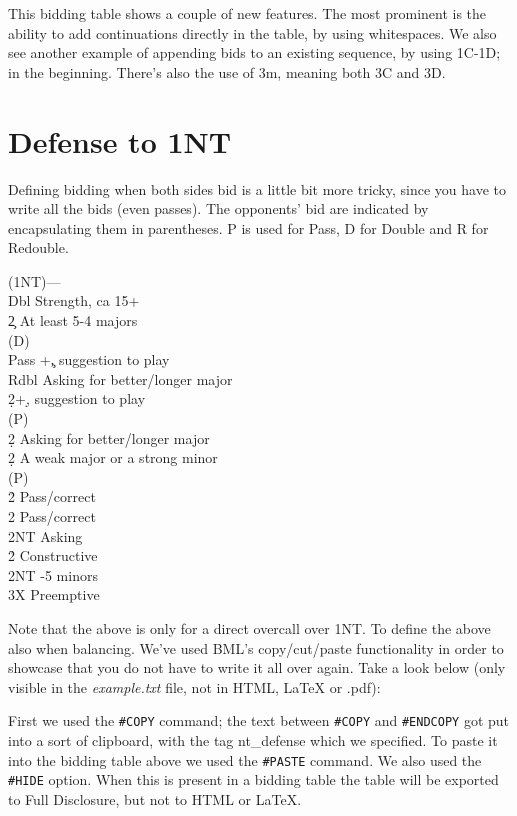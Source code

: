 \documentclass[a4paper]{article}
\begin{document}
This bidding table shows a couple of new features. The most
prominent is the ability to add continuations directly in the
table, by using whitespaces. We also see another example of
appending bids to an existing sequence, by using 1C-1D; in the
beginning. There's also the use of 3m, meaning both 3C and 3D.

\section{Defense to 1NT}

Defining bidding when both sides bid is a little bit more tricky,
since you have to write all the bids (even passes). The opponents'
bid are indicated by encapsulating them in parentheses. P is used
for Pass, D for Double and R for Redouble.

\begin{bidtable}
(1NT)---\\
Dbl \> Strength, ca 15+\\
2\c \> At least 5-4 majors\+\\
(D)\+\\
Pass +\c , suggestion to play\\
Rdbl \> Asking for better/longer major\\
2\d {}+\d , suggestion to play\-\\
(P)\+\\
2\d \> Asking for better/longer major\-\-\\
2\d \> A weak major or a strong minor\+\\
(P)\+\\
2\h \> Pass/correct\\
2\s \> Pass/correct\\
2NT \> Asking\-\-\\
2\h\s \> Constructive\\
2NT -5 minors\\
3X \> Preemptive
\end{bidtable}

Note that the above is only for a direct overcall over 1NT. To
define the above also when balancing. We've used BML's
copy/cut/paste functionality in order to showcase that you do not
have to write it all over again. Take a look below (only visible in
the \emph{example.txt} file, not in HTML, LaTeX or .pdf):

First we used the \texttt{\#COPY} command; the text between \texttt{\#COPY} and \texttt{\#ENDCOPY}
got put into a sort of clipboard, with the tag nt\_defense which we
specified. To paste it into the bidding table above we used
the \texttt{\#PASTE} command. We also used the \texttt{\#HIDE} option. When this is
present in a bidding table the table will be exported to Full
Disclosure, but not to HTML or LaTeX.
\end{document}
